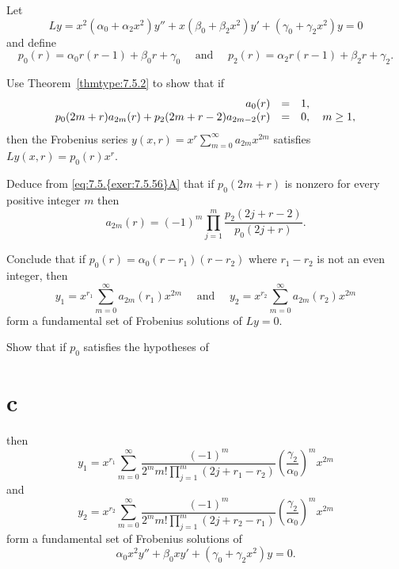 \begin{exerciselist}
  \item\label{exer:7.5.56} Let
  \[
    Ly=x^{2}(\alpha_{0}+\alpha_{2}x^{2})y''+x(\beta_{0}+\beta_{2}x^{2})y'+ (\gamma_{0}+\gamma_{2}x^{2})y=0
  \]
  and define
  \[
    p_{0}(r)=\alpha_{0}r(r-1)+\beta_{0}r+\gamma_{0}\quad\mbox{ and }\quad p_{2}(r)=\alpha_{2}r(r-1)+\beta_{2}r+\gamma_{2}.
  \]
  \begin{alist}
    \item %
    Use Theorem~\ref{thmtype:7.5.2} to show that if
    \setcounter{equation}{0}
    \begin{equation}
      \label{eq:7.5.{exer:7.5.56}A}
      \begin{array}{rcl}
        a_{0}(r)                                      & = & 1,             \\
        p_{0}(2m+r)a_{2m}(r)+p_{2}(2m+r-2)a_{2m-2}(r) & = & 0,\quad m\ge1,
      \end{array}
    \end{equation}
    then the Frobenius series $y(x,r)=x^{r}\sum_{m=0}^{\infty}a_{2m}x^{2m}$ satisfies
    $Ly(x,r)=p_{0}(r)x^{r}$.

    \item %
    Deduce from \eqref{eq:7.5.{exer:7.5.56}A} that if $p_{0}(2m+r)$ is nonzero for every positive
    integer $m$ then
    \[
      a_{2m}(r)=(-1)^{m}\prod_{j=1}^{m}\frac{p_{2}(2j+r-2)}{p_{0}(2j+r)}.
    \]

    \item %
    Conclude that if $p_{0}(r)=\alpha_{0}(r-r_{1})(r-r_{2})$ where $r_{1}-r_{2}$ is not an even
    integer, then
    \[
      y_{1}=x^{r_{1}}\sum_{m=0}^{\infty}a_{2m}(r_{1})x^{2m}\quad\mbox{ and }\quad y_{2}=x^{r_{2}}\sum_{m=0}^{\infty}a_{2m}(r_{2})x^{2m}
    \]
    form a fundamental set of Frobenius solutions of $Ly=0$.

    \item %
    Show that if $p_{0}$ satisfies the hypotheses of \part{c} then
    \[
      y_{1}=x^{r_{1}}\sum_{m=0}^{\infty}\frac{(-1)^{m}}{2^{m}m!\prod_{j=1}^{m}(2j+r_{1}-r_{2})}\left(\frac{\gamma_{2}}{\alpha_{0}}\right)^{m}x^{2m}
    \]
    and
    \[
      y_{2}=x^{r_{2}}\sum_{m=0}^{\infty}\frac{(-1)^{m}}{2^{m}m!\prod_{j=1}^{m}(2j+r_{2}-r_{1})}\left(\frac{\gamma_{2}}{\alpha_{0}}\right)^{m}x^{2m}
    \]
    form a fundamental set of Frobenius solutions of
    \[
      \alpha_{0}x^{2}y''+\beta_{0}xy'+(\gamma_{0}+\gamma_{2}x^{2})y=0.
    \]
  \end{alist}


\end{exerciselist}
